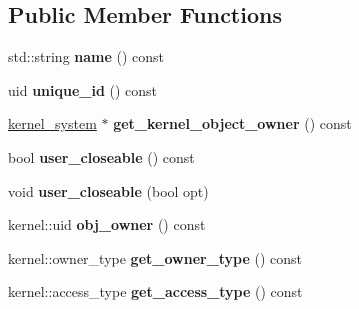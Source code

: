 \subsection*{Public Member Functions}
\begin{DoxyCompactItemize}
\item 
\mbox{\label{classeka2l1_1_1kernel_1_1kernel__obj_a864a8657aee16039e7f1c46b7e4bd566}} 
std\+::string {\bfseries name} () const
\item 
\mbox{\label{classeka2l1_1_1kernel_1_1kernel__obj_abe5ece2649ae927706f18779c674f0b7}} 
uid {\bfseries unique\+\_\+id} () const
\item 
\mbox{\label{classeka2l1_1_1kernel_1_1kernel__obj_a68dc750833e3a1fb93ccb470563e6e40}} 
\mbox{\hyperlink{classeka2l1_1_1kernel__system}{kernel\+\_\+system}} $\ast$ {\bfseries get\+\_\+kernel\+\_\+object\+\_\+owner} () const
\item 
\mbox{\label{classeka2l1_1_1kernel_1_1kernel__obj_a8333d00c87854de0ebeff0559f8a5526}} 
bool {\bfseries user\+\_\+closeable} () const
\item 
\mbox{\label{classeka2l1_1_1kernel_1_1kernel__obj_acd64568b9c566ac3612f78fb5491e7b0}} 
void {\bfseries user\+\_\+closeable} (bool opt)
\item 
\mbox{\label{classeka2l1_1_1kernel_1_1kernel__obj_a8cec5100723668bfd4a7e405c98b0ebc}} 
kernel\+::uid {\bfseries obj\+\_\+owner} () const
\item 
\mbox{\label{classeka2l1_1_1kernel_1_1kernel__obj_a8562213e06f0f325a0f5b4167622a39b}} 
kernel\+::owner\+\_\+type {\bfseries get\+\_\+owner\+\_\+type} () const
\item 
\mbox{\label{classeka2l1_1_1kernel_1_1kernel__obj_a612b46734af9d7ec1fd268b52a07f8be}} 
kernel\+::access\+\_\+type {\bfseries get\+\_\+access\+\_\+type} () const
\item 
\mbox{\label{classeka2l1_1_1kernel_1_1kernel__obj_a309fdecf373e587d29b1bf7826377fdb}} 

\end{DoxyCompactItemize}
